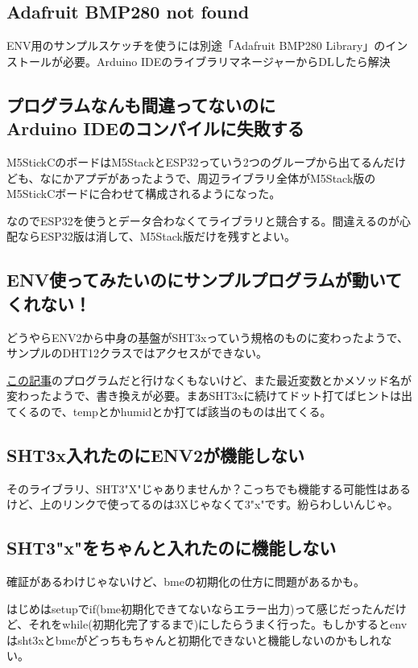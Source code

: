 \documentclass[fleqn,twocolumn]{mynote}
\begin{document}
\subsection*{Adafruit BMP280 not found}
ENV用のサンプルスケッチを使うには別途「Adafruit BMP280 Library」のインストールが必要。Arduino IDEのライブラリマネージャーからDLしたら解決

\subsection*{プログラムなんも間違ってないのに\\Arduino IDEのコンパイルに失敗する}
M5StickCのボードはM5StackとESP32っていう2つのグループから出てるんだけども、なにかアプデがあったようで、周辺ライブラリ全体がM5Stack版のM5StickCボードに合わせて構成されるようになった。

なのでESP32を使うとデータ合わなくてライブラリと競合する。間違えるのが心配ならESP32版は消して、M5Stack版だけを残すとよい。

\subsection*{ENV使ってみたいのにサンプルプログラムが動いてくれない！}
どうやらENV2から中身の基盤がSHT3xっていう規格のものに変わったようで、サンプルのDHT12クラスではアクセスができない。

\href{https://qiita.com/visyeii/items/e28f8500f43166710664}{この記事}のプログラムだと行けなくもないけど、また最近変数とかメソッド名が変わったようで、書き換えが必要。まあSHT3xに続けてドット打てばヒントは出てくるので、tempとかhumidとか打てば該当のものは出てくる。

\subsection*{SHT3x入れたのにENV2が機能しない}
そのライブラリ、SHT3"X"じゃありませんか？こっちでも機能する可能性はあるけど、上のリンクで使ってるのは3Xじゃなくて3"x"です。紛らわしいんじゃ。

\subsection*{SHT3"x"をちゃんと入れたのに機能しない}
確証があるわけじゃないけど、bmeの初期化の仕方に問題があるかも。

はじめはsetupでif(bme初期化できてないならエラー出力)って感じだったんだけど、それをwhile(初期化完了するまで)にしたらうまく行った。もしかするとenvはsht3xとbmeがどっちもちゃんと初期化できないと機能しないのかもしれない。



\end{document}
